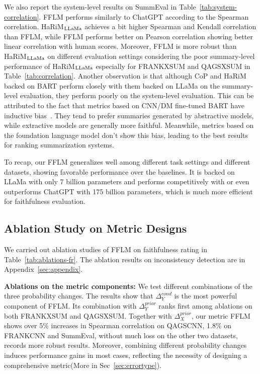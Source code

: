 We also report the system-level results on SummEval in Table~\ref{tab:system-correlation}. FFLM performs similarly to ChatGPT according to the Spearman correlation. 
HaRiM$_{\rm LLaMa}$ achieves a bit higher Spearman and Kendall correlation than FFLM, while FFLM performs better on Pearson correlation showing better linear correlation with human scores.
Moreover, FFLM is more robust than HaRiM$_{\rm LLaMa}$ on different evaluation settings considering the poor summary-level performance of HaRiM$_{\rm LLaMa}$ especially for FRANKXSUM and QAGSXSUM in Table~\ref{tab:correlation}. Another observation is that although CoP and HaRiM backed on BART perform closely with them backed on LLaMa on the summary-level evaluation, they perform poorly on the system-level evaluation. This can be attributed to the fact that metrics based on CNN/DM fine-tuned BART have inductive bias~\cite{son2022harim}. They tend to prefer summaries generated by abstractive models, while extractive models are generally more faithful. Meanwhile, metrics based on the foundation language model don't show this bias, leading to the best results for ranking summarization systems.




To recap, our FFLM generalizes well among different task settings and different datasets, showing favorable performance over the baselines. 
It is backed on LLaMa with only 7 billion parameters and performs competitively with or even outperforms ChatGPT with 175 billion parameters, which is much more efficient for faithfulness evaluation.





\subsection{Ablation Study on Metric Designs}
\label{sec:analysis-design}

We carried out ablation studies of FFLM on faithfulness rating in Table~\ref{tab:ablations-fr}. The ablation results on inconsistency detection are in Appendix~\ref{sec:appendix}.

\textbf{Ablations on the metric components:} We test different combinations of the three probability changes. The results show that $\Delta_{Y}^{cond}$ is the most powerful component of FFLM. Its combination with $\Delta_{Y}^{prior}$ ranks first among ablations on both FRANKXSUM and QAGSXSUM. Together with $\Delta_{X}^{prior}$, our metric FFLM shows over 5\% increases in Spearman correlation on QAGSCNN, 1.8\% on FRANKCNN and SummEval,  without much loss on the other two datasets, records more robust results. Moreover, combining different probability changes induces performance gains in most cases, reflecting the necessity of designing a comprehensive metric(More in Sec~\ref{sec:errortype}).

